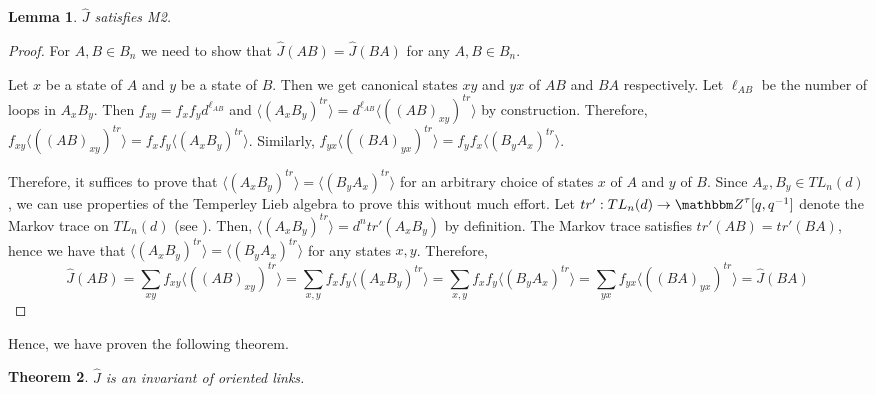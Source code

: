 \documentclass{amsart}
\theoremstyle{plain}
\newtheorem{theorem}{Theorem}
\newtheorem{lemma}[theorem]{Lemma}
\theoremstyle{definition}
\theoremstyle{definition}
\numberwithin{equation}{section}
\numberwithin{theorem}{section}
\renewcommand{\to}{\rightarrow}
\numberwithin{equation}{section}
\let\hat=\widehat
\def\Z{{\mathbbm Z}}
\begin{document}
\begin{lemma}\label{M2-pf}
  $\hat{J}$ satisfies M2.
\end{lemma}
\begin{proof}
For $A,B \in B_n$ we need to show that $\hat{J}(AB)=\hat{J}(BA)$ for any $A,B\in B_n$.

Let $x$ be a state of $A$ and $y$ be a state of $B$. Then we get canonical states $xy$ and $yx$ of $AB$ and $BA$ respectively.
Let $\ell_{AB}$ be the number of loops in $A_xB_y$. Then $f_{xy}=f_xf_y d^{\ell_{AB}}$ and $\langle (A_xB_y)^{tr}\rangle =d^{\ell_{AB}}\langle ((AB)_{xy})^{tr} \rangle$ by construction.
Therefore, $f_{xy}\langle ((AB)_{xy})^{tr}\rangle=f_xf_y \langle (A_xB_y)^{tr}\rangle $.
Similarly, $f_{yx}\langle ((BA)_{yx})^{tr} \rangle=f_yf_x \langle (B_yA_x)^{tr}\rangle$.

Therefore, it suffices to prove that $\langle (A_xB_y)^{tr}\rangle=\langle (B_yA_x)^{tr} \rangle$ for an arbitrary choice of states $x$ of $A$ and $y$ of $B$.
Since $A_x, B_y\in TL_n(d)$, we can use properties of the Temperley Lieb algebra to prove this without much effort.
Let $tr':TL_n(d)\to \Z^{\tau}[q,q^{- 1}]$ denote the Markov trace on $TL_n(d)$ (see \cite[Definition 2.12]{AJL}).
Then, $\langle (A_xB_y)^{tr} \rangle=d^n tr'(A_xB_y)$ by definition.
The Markov trace satisfies $tr'(AB)=tr'(BA)$, hence we have that $\langle (A_xB_y)^{tr} \rangle= \langle (B_yA_x)^{tr} \rangle$ for any states $x,y$.
%
Therefore,
\[
\hat{J}(AB)=\sum_{xy} f_{xy}\langle ((AB)_{xy})^{tr}\rangle= \sum_{x,y}f_xf_y\langle (A_xB_y)^{tr}\rangle=\sum_{x,y}f_xf_y \langle (B_yA_x)^{tr}\rangle=\sum_{yx} f_{yx}\langle ((BA)_{yx})^{tr}\rangle=\hat{J}(BA)
\]
\end{proof}

Hence, we have proven the following theorem.
\begin{theorem}\label{thm:decat-braid-invar}
  $\hat{J}$ is an invariant of oriented links.
\end{theorem}
\end{document}
